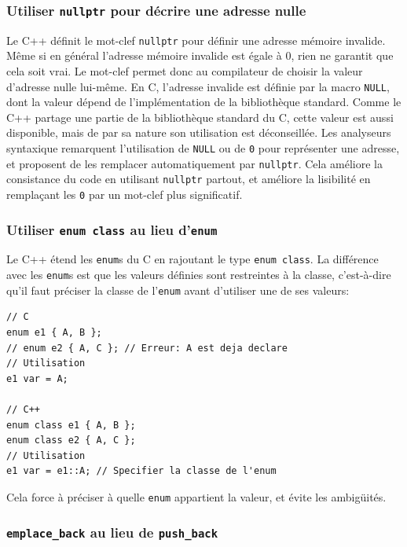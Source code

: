 \subsubsection{\texorpdfstring{Utiliser \texttt{nullptr} pour décrire
une adresse nulle}{Utiliser nullptr pour décrire une adresse nulle}}

Le C++ définit le mot-clef \texttt{nullptr} pour définir une adresse
mémoire invalide. Même si en général l'adresse mémoire invalide est
égale à 0, rien ne garantit que cela soit vrai. Le mot-clef permet donc
au compilateur de choisir la valeur d'adresse nulle lui-même. En C,
l'adresse invalide est définie par la macro \texttt{NULL}, dont la
valeur dépend de l'implémentation de la bibliothèque standard. Comme le
C++ partage une partie de la bibliothèque standard du C, cette valeur
est aussi disponible, mais de par sa nature son utilisation est
déconseillée. Les analyseurs syntaxique remarquent l'utilisation de
\texttt{NULL} ou de \texttt{0} pour représenter une adresse, et
proposent de les remplacer automatiquement par \texttt{nullptr}. Cela
améliore la consistance du code en utilisant \texttt{nullptr} partout,
et améliore la lisibilité en remplaçant les \texttt{0} par un mot-clef
plus significatif.

\subsubsection{\texorpdfstring{Utiliser \texttt{enum\ class} au lieu
d'\texttt{enum}}{Utiliser enum class au lieu d'enum}}

Le C++ étend les \texttt{enum}s du C en rajoutant le type
\texttt{enum\ class}. La différence avec les \texttt{enum}s est que les
valeurs définies sont restreintes à la classe, c'est-à-dire qu'il faut
préciser la classe de l'\texttt{enum} avant d'utiliser une de ses
valeurs:

\lstset{language=C++}
\begin{lstlisting}
// C
enum e1 { A, B };
// enum e2 { A, C }; // Erreur: A est deja declare
// Utilisation
e1 var = A;

// C++
enum class e1 { A, B };
enum class e2 { A, C };
// Utilisation
e1 var = e1::A; // Specifier la classe de l'enum
\end{lstlisting}

Cela force à préciser à quelle \texttt{enum} appartient la valeur, et
évite les ambigüités.

\subsubsection{\texorpdfstring{\texttt{emplace\_back} au lieu de
\texttt{push\_back}}{emplace\_back au lieu de push\_back}}

